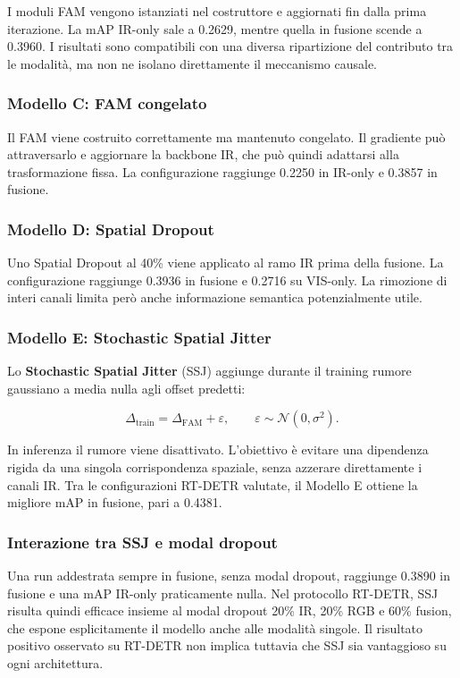 \documentclass[a4paper,11pt]{article}
\begin{document}
I moduli FAM vengono istanziati nel costruttore e aggiornati fin dalla prima iterazione. La mAP IR-only sale a 0.2629, mentre quella in fusione scende a 0.3960. I risultati sono compatibili con una diversa ripartizione del contributo tra le modalità, ma non ne isolano direttamente il meccanismo causale.

\subsubsection{Modello C: FAM congelato}

Il FAM viene costruito correttamente ma mantenuto congelato. Il gradiente può attraversarlo e aggiornare la backbone IR, che può quindi adattarsi alla trasformazione fissa. La configurazione raggiunge 0.2250 in IR-only e 0.3857 in fusione.

\subsubsection{Modello D: Spatial Dropout}

Uno Spatial Dropout al 40\% viene applicato al ramo IR prima della fusione. La configurazione raggiunge 0.3936 in fusione e 0.2716 su VIS-only. La rimozione di interi canali limita però anche informazione semantica potenzialmente utile.

\subsubsection{Modello E: Stochastic Spatial Jitter}

Lo \textbf{Stochastic Spatial Jitter} (SSJ) aggiunge durante il training rumore gaussiano a media nulla agli offset predetti:

\[
\Delta_{\mathrm{train}}=\Delta_{\mathrm{FAM}}+\varepsilon,
\qquad \varepsilon\sim\mathcal{N}(0,\sigma^2).
\]

In inferenza il rumore viene disattivato. L'obiettivo è evitare una dipendenza rigida da una singola corrispondenza spaziale, senza azzerare direttamente i canali IR. Tra le configurazioni RT-DETR valutate, il Modello E ottiene la migliore mAP in fusione, pari a 0.4381.

\subsubsection{Interazione tra SSJ e modal dropout}

Una run addestrata sempre in fusione, senza modal dropout, raggiunge 0.3890 in fusione e una mAP IR-only praticamente nulla. Nel protocollo RT-DETR, SSJ risulta quindi efficace insieme al modal dropout 20\% IR, 20\% RGB e 60\% fusion, che espone esplicitamente il modello anche alle modalità singole. Il risultato positivo osservato su RT-DETR non implica tuttavia che SSJ sia vantaggioso su ogni architettura.
\end{document}
